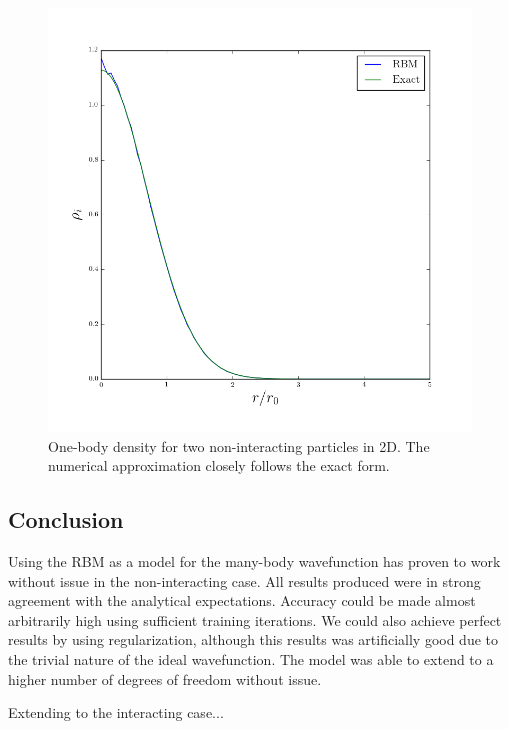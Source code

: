 \documentclass[a4paper, 11pt]{article}
\begin{document}
\begin{figure}[ht]
    \centering
    \includegraphics[width=0.8\linewidth]{../results/P2-D2-onebody.png}
    \caption{One-body density for two non-interacting particles in 2D. The
    numerical approximation closely follows the exact form.}
    \label{fig:rbm-onebody-ideal}
\end{figure}

\begin{multicols}{2}


    \section{Conclusion}

    Using the RBM as a model for the many-body wavefunction has proven to work
    without issue in the non-interacting case. All results produced were in
    strong agreement with the analytical expectations. Accuracy could be made
    almost arbitrarily high using sufficient training iterations. We could also
    achieve perfect results by using regularization, although this results was
    artificially good due to the trivial nature of the ideal wavefunction. The
    model was able to extend to a higher number of degrees of freedom without
    issue. 

    Extending to the interacting case...

    \printbibliography
\end{multicols}
\end{document}
